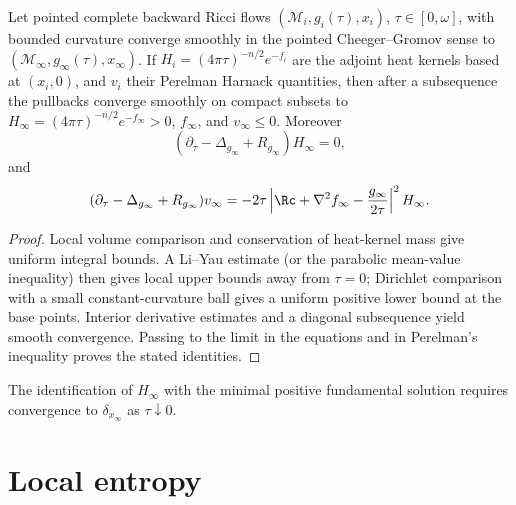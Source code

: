 \begin{lemma}
\label{lem:chow-iii-heat-kernel-cheeger-gromov}
Let pointed complete backward Ricci flows \((\mathcal M_i,g_i(\tau),x_i)\),
\(\tau\in[0,\omega]\), with bounded curvature converge smoothly in the pointed
Cheeger--Gromov sense to \((\mathcal M_\infty,g_\infty(\tau),x_\infty)\).  If
\(H_i=(4\pi\tau)^{-n/2}e^{-f_i}\) are the adjoint heat kernels based at
\((x_i,0)\), and \(v_i\) their Perelman Harnack quantities, then after a
subsequence the pullbacks converge smoothly on compact subsets to
\(H_\infty=(4\pi\tau)^{-n/2}e^{-f_\infty}>0\), \(f_\infty\), and \(v_\infty\le0\).
Moreover
\[
 (\partial_\tau-\Delta_{g_\infty}+R_{g_\infty})H_\infty=0,
\]
and
\[
 (\partial_\tau-\Delta_{g_\infty}+R_{g_\infty})v_\infty
 =-2\tau\left|\Rc+\nabla^2f_\infty-\frac{g_\infty}{2\tau}\right|^2H_\infty.
\]
\end{lemma}
\begin{proof}
\sketch Local volume comparison and conservation of heat-kernel mass give uniform
integral bounds.  A Li--Yau estimate (or the parabolic mean-value inequality)
then gives local upper bounds away from \(\tau=0\); Dirichlet comparison with
a small constant-curvature ball gives a uniform positive lower bound at the
base points.  Interior derivative estimates and a diagonal subsequence yield
smooth convergence.  Passing to the limit in the equations and in
Perelman's inequality proves the stated identities.
\end{proof}

\begin{remark}
\label{rem:chow-iii-heat-kernel-minimality}
The identification of \(H_\infty\) with the minimal positive fundamental
solution requires convergence to \(\delta_{x_\infty}\) as
\(\tau\downarrow0\).
\end{remark}

\section{Local entropy}

